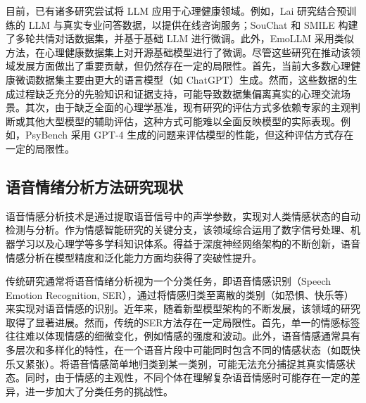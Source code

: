 目前，已有诸多研究尝试将 LLM 应用于心理健康领域。例如，Lai\cite{Lai_Shi_Du_Wu_Fu_Dou_Wang_2023} 研究结合预训练的 LLM 与真实专业问答数据，以提供在线咨询服务；SouChat\cite{Chen_Xing_Lin_Zheng_Wang_Liu_Xu_2023} 和 SMILE\cite{Qiu_He_Zhang_Li_Lan_2023} 构建了多轮共情对话数据集，并基于基础 LLM 进行微调。此外，EmoLLM\cite{yang2024emollmmultimodalemotionalunderstanding} 采用类似方法，在心理健康数据集上对开源基础模型进行了微调。尽管这些研究在推动该领域发展方面做出了重要贡献，但仍然存在一定的局限性。首先，当前大多数心理健康微调数据集主要由更大的语言模型（如 ChatGPT）生成。然而，这些数据的生成过程缺乏充分的先验知识和证据支持，可能导致数据集偏离真实的心理交流场景。其次，由于缺乏全面的心理学基准，现有研究的评估方式多依赖专家的主观判断或其他大型模型的辅助评估，这种方式可能难以全面反映模型的实际表现。例如，PsyBench\cite{Zhang_He_Song_He_Zhang_Qiu_Li_Ma_Lan_2023} 采用 GPT-4\cite{Achiam_Adler_Agarwal_Ahmad_Akkaya_Aleman_Almeida_Altenschmidt_Altman_Anadkat_et} 生成的问题来评估模型的性能，但这种评估方式存在一定的局限性。


\subsection{语音情绪分析方法研究现状}

语音情感分析技术是通过提取语音信号中的声学参数，实现对人类情感状态的自动检测与分析。作为情感智能研究的关键分支，该领域综合运用了数字信号处理、机器学习以及心理学等多学科知识体系。得益于深度神经网络架构的不断创新，语音情感分析在模型精度和泛化能力方面均获得了突破性提升。

传统研究通常将语音情绪分析视为一个分类任务，即语音情感识别（Speech Emotion Recognition, SER），通过将情感归类至离散的类别（如恐惧、快乐等）来实现对语音情感的识别\cite{El_Ayadi_Kamel_Karray_2011}\cite{Nwe_Foo_De_Silva_2003}\cite{Jiang_Fu_Tao_Lei_Zhao_2019}。近年来，随着新型模型架构的不断发展，该领域的研究取得了显著进展。然而，传统的SER方法存在一定局限性。首先，单一的情感标签往往难以体现情感的细微变化，例如情感的强度和波动。此外，语音情感通常具有多层次和多样化的特性，在一个语音片段中可能同时包含不同的情感状态（如既快乐又紧张）。将语音情感简单地归类到某一类别，可能无法充分捕捉其真实情感状态。同时，由于情感的主观性，不同个体在理解复杂语音情感时可能存在一定的差异，进一步加大了分类任务的挑战性。

